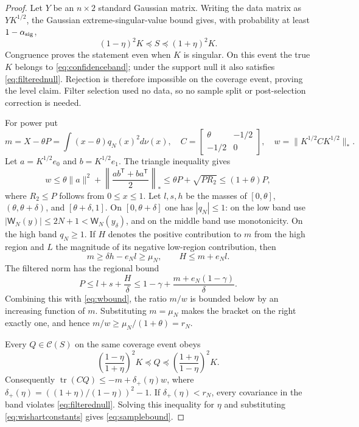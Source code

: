 \documentclass[11pt]{article}
\theoremstyle{definition}
\theoremstyle{remark}
\begin{document}
\begin{proof}
Let $Y$ be an $n\times2$ standard Gaussian matrix.  Writing the data matrix as
$YK^{1/2}$, the Gaussian extreme-singular-value bound
\cite{RudelsonVershynin2010} gives, with probability
at least $1-\alpha_{\rm sig}$,
\[
 (1-\eta)^2K\preceq S\preceq(1+\eta)^2K.
\]
Congruence proves the statement even when $K$ is singular.  On this event the
true $K$ belongs to \eqref{eq:confidenceband}; under the support null it also
satisfies \eqref{eq:filterednull}.  Rejection is therefore impossible on the
coverage event, proving the level claim.  Filter selection used no data, so no
sample split or post-selection correction is needed.

For power put
\[
 m=X-\theta P=\int(x-\theta)q_N(x)^2d\nu(x),
 \quad C=\begin{bmatrix}\theta&-1/2\\-1/2&0\end{bmatrix},
 \quad w=\|K^{1/2}CK^{1/2}\|_*.
\]
Let $a=K^{1/2}e_0$ and $b=K^{1/2}e_1$.  The triangle inequality gives
\begin{equation}
 w\leq\theta\|a\|^2+
 \left\|\frac{ab^{\mathsf T}+ba^{\mathsf T}}2\right\|_*
 \leq\theta P+\sqrt{PR_2}\leq(1+\theta)P,             \label{eq:wbound}
\end{equation}
where $R_2\leq P$ follows from $0\leq x\leq1$.
Let $l,s,h$ be the masses of $[0,\theta]$,
$(\theta,\theta+\delta)$, and $[\theta+\delta,1]$.
On $[0,\theta+\delta]$ one has $|q_N|\leq1$: on the low band use
$|\mathsf W_N(y)|\leq2N+1<\mathsf W_N(y_\delta)$, and on the middle band use
monotonicity.  On the high band $q_N\geq1$.
If $H$ denotes the positive contribution to $m$ from the high region and
$L$ the magnitude of its negative low-region contribution, then
\[
 m\geq\delta h-e_Nl\geq\mu_N,
 \qquad H\leq m+e_Nl.
\]
The filtered norm has the regional bound
\[
 P\leq l+s+\frac{H}{\delta}
 \leq1-\gamma+\frac{m+e_N(1-\gamma)}{\delta}.
\]
Combining this with \eqref{eq:wbound}, the ratio $m/w$ is bounded below by
an increasing function of $m$.  Substituting $m=\mu_N$ makes the bracket on
the right exactly one, and hence $m/w\geq\mu_N/(1+\theta)=r_N$.

Every $Q\in\mathcal C(S)$ on the same coverage event obeys
\[
 \left(\frac{1-\eta}{1+\eta}\right)^2K
 \preceq Q\preceq
 \left(\frac{1+\eta}{1-\eta}\right)^2K.
\]
Consequently
$\operatorname{tr}(CQ)\leq-m+\delta_+(\eta)w$, where
$\delta_+(\eta)=((1+\eta)/(1-\eta))^2-1$.
If $\delta_+(\eta)<r_N$, every covariance in the band violates
\eqref{eq:filterednull}.  Solving this inequality for $\eta$ and substituting
\eqref{eq:wishartconstants} gives \eqref{eq:samplebound}.
\end{proof}
\end{document}
